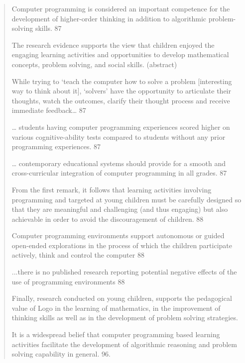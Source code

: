 \documentclass[12pt]{extarticle}
\begin{document}
\begin{quotation}
    
    Computer programming is considered an important competence for the development of higher-order thinking in addition to algorithmic problem-solving skills. 87
    
    The research evidence supports the view that children enjoyed the engaging learning activities and opportunities to develop mathematical concepts, problem solving, and social skills. 	(abstract)
    
    While trying to ‘teach the computer how to solve a problem [interesting way to think about it], ‘solvers’ have the opportunity to articulate their thoughts, watch the outcomes, clarify their thought process and receive immediate feedback… 87
    
    … students having computer programming experiences scored higher on various cognitive-ability tests compared to students without any prior programming experiences. 	87
    
    … contemporary educational systems should provide for a smooth and cross-curricular integration of computer programming in all grades.	87
    
    From the first remark, it follows that learning activities involving programming and targeted at young children must be carefully designed so that they are meaningful and challenging (and thus engaging) but also achievable in order to avoid the discouragement of children. 88
    
    Computer programming environments support autonomous or guided open-ended explorations in the process of which the children participate actively, think and control the computer	88
    
    ...there is no published research reporting potential negative effects of the use of programming environments	88
    
    Finally, research conducted on young children, supports the pedagogical value of Logo in the learning of mathematics, in the improvement of thinking skills as well as in the development of problem solving strategies.
    
    It is a widespread belief that computer programming based learning activities facilitate the development of algorithmic reasoning and problem solving capability in general. 	96.

\end{quotation}    
\end{document}
